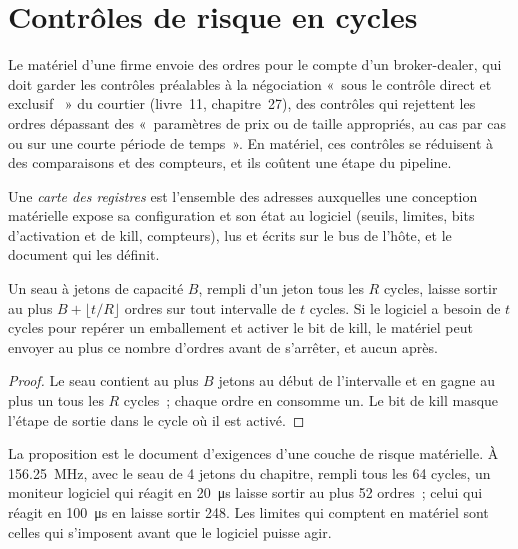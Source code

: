 \section{Contrôles de risque en cycles}

Le matériel d'une firme envoie des ordres pour le compte d'un broker-dealer, qui doit garder les contrôles préalables à la négociation «~sous le contrôle direct et exclusif
~» du courtier (livre~11, chapitre~27), des contrôles qui rejettent les ordres dépassant des «~paramètres de prix ou de taille appropriés,
au cas par cas ou sur une courte période de temps~». En matériel, ces contrôles se réduisent à des comparaisons et des compteurs, et ils coûtent une
étape du pipeline.

\begin{definition}\label{def:nw:programmable-hardware-ii-trading-designs:regmap}
Une \emph{carte des registres} est l'ensemble des adresses auxquelles une conception matérielle expose sa configuration et son état au
logiciel (seuils, limites, bits d'activation et de kill, compteurs), lus et écrits sur le bus de l'hôte, et le document qui les
définit.
\end{definition}

\label{lst:nw:programmable-hardware-ii-trading-designs:risk}

\begin{proposition}\label{prop:nw:programmable-hardware-ii-trading-designs:bucket}
Un seau à jetons de capacité $B$, rempli d'un jeton tous les $R$ cycles, laisse sortir au plus $B + \lfloor t/R\rfloor$ ordres sur tout intervalle
de $t$ cycles. Si le logiciel a besoin de $t$ cycles pour repérer un emballement et activer le bit de kill, le matériel peut envoyer au plus ce nombre d'ordres
avant de s'arrêter, et aucun après.
\end{proposition}

\begin{proof}
Le seau contient au plus $B$ jetons au début de l'intervalle et en gagne au plus un tous les $R$ cycles~; chaque ordre en consomme un. Le
bit de kill masque l'étape de sortie dans le cycle où il est activé.
\end{proof}

La proposition est le document d'exigences d'une couche de risque matérielle. À 156.25~MHz, avec le seau de 4 jetons du chapitre, rempli
tous les 64 cycles, un moniteur logiciel qui réagit en \qty{20}{\micro\second} laisse sortir au plus 52 ordres~; celui qui réagit en
\qty{100}{\micro\second} en laisse sortir 248. Les limites qui comptent en matériel sont celles qui s'imposent avant que le logiciel puisse agir.

